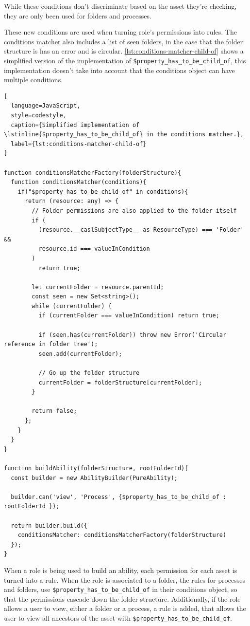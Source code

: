 While these conditions don't discriminate based on the asset they're checking, they are
only been used for folders and processes.

These new conditions are used when turning role's permissions into rules.
The conditions matcher also includes a list of seen folders, in the case that the folder
structure is has an error and is circular.
\ref{lst:conditions-matcher-child-of} shows a simplified version of the implementation of
\lstinline{$property_has_to_be_child_of}, this implementation doesn't take into account
that the conditions object can have multiple conditions.

\begin{lstlisting}[
  language=JavaScript,
  style=codestyle,
  caption={Simplified implementation of \lstinline{$property_has_to_be_child_of} in the conditions matcher.},
  label={lst:conditions-matcher-child-of}
]

function conditionsMatcherFactory(folderStructure){
  function conditionsMatcher(conditions){
    if("$property_has_to_be_child_of" in conditions){
      return (resource: any) => {
        // Folder permissions are also applied to the folder itself
        if (
          (resource.__caslSubjectType__ as ResourceType) === 'Folder' &&
          resource.id === valueInCondition
        )
          return true;

        let currentFolder = resource.parentId;
        const seen = new Set<string>();
        while (currentFolder) {
          if (currentFolder === valueInCondition) return true;

          if (seen.has(currentFolder)) throw new Error('Circular reference in folder tree');
          seen.add(currentFolder);

          // Go up the folder structure
          currentFolder = folderStructure[currentFolder];
        }

        return false;
      };
    }
  }
}

function buildAbility(folderStructure, rootFolderId){
  const builder = new AbilityBuilder(PureAbility);

  builder.can('view', 'Process', {$property_has_to_be_child_of : rootFolderId });

  return builder.build({
    conditionsMatcher: conditionsMatcherFactory(folderStructure) 
  });
}
\end{lstlisting}

When a role is being used to build an ability, each permission for each asset is turned into a
rule.
When the role is associated to a folder, the rules for processes and folders, use
\lstinline{$property_has_to_be_child_of} in their conditions object, so that the
permissions cascade down the folder structure.
Additionally, if the role allows a user to view, either a folder or a process, a rule is
added, that allows the user to view all ancestors of the asset with
\lstinline{$property_has_to_be_child_of}.

